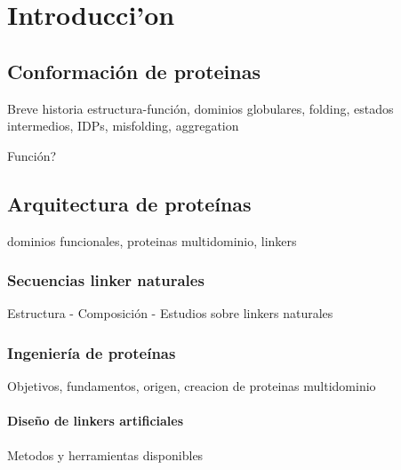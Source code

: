 \chapter{Introducci'on}
% 



\section{Conformación de proteinas}
Breve historia estructura-función, dominios globulares, folding, estados intermedios, IDPs, misfolding, aggregation 

Función?

\section{Arquitectura de proteínas}
dominios funcionales, proteinas multidominio, linkers 

\subsection{Secuencias linker naturales}
Estructura - Composición -  Estudios sobre linkers naturales

\subsection{Ingeniería de proteínas}
Objetivos, fundamentos, origen, creacion de proteinas multidominio



\subsubsection{Diseño de linkers artificiales}
Metodos y herramientas disponibles




